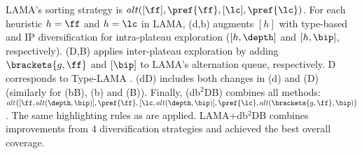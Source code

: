 \begin{table*}[htbp]
{ %
LAMA's sorting strategy is $alt([\ff],\pref{\ff},[\lc],\pref{\lc})$.
For each heuristic $h=\ff$ and $h=\lc$ in LAMA,
(d,b) augments $[h]$ with type-based and IP diversification for intra-plateau exploration ($[h,\depth]$ and $[h,\bip]$, respectively).
(D,B) applies inter-plateau exploration by adding $\brackets{g,\ff}$ and $[\bip]$ to LAMA's alternation queue, respectively. D corresponds to Type-LAMA \cite{xie14type}.
(dD) includes both changes in (d) and (D) (similarly for (bB), (b) and (B)).
Finally, (db$^2$DB) combines all methods:
{\small $alt\big([\ff,alt(\depth,\bip)], \pref{\ff}, [\lc,alt(\depth,\bip)], \pref{\lc}, alt(\brackets{g,\ff},\bip)\big)$.}
The same highlighting rules as  are applied.
LAMA+db$^2$DB combines improvements from 4 diversification strategies and achieved the best overall coverage.
}
\label{tbl:lama}
\end{table*}
